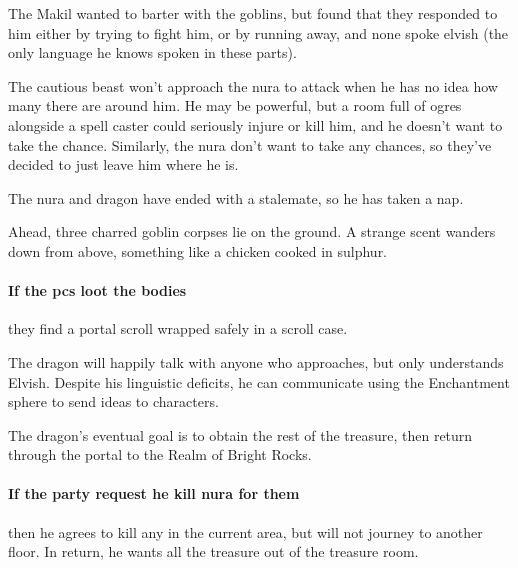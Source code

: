 \begin{multicols}{2}
\begin{exampletext}
  The Makil wanted to barter with the goblins, but found that they responded to him either by trying to fight him, or by running away, and none spoke elvish (the only language he knows spoken in these parts).

  The cautious beast won't approach the nura to attack when he has no idea how many there are around him.
  He may be powerful, but a room full of ogres alongside a spell caster could seriously injure or kill him, and he doesn't want to take the chance.
  Similarly, the nura don't want to take any chances, so they've decided to just leave him where he is.

  The nura and dragon have ended with a stalemate, so he has taken a nap.

\end{exampletext}

\begin{boxtext}

  Ahead, three charred goblin corpses lie on the ground.
  A strange scent wanders down from above, something like a chicken cooked in sulphur.

\end{boxtext}

\paragraph{If the \glspl{pc} loot the bodies}
they find a portal scroll wrapped safely in a scroll case.


The dragon will happily talk with anyone who approaches, but only understands Elvish.
\iftoggle{hardcore}{}{%
  Remind the players that they can spend a Story Point to say that they know another language, as long as they say when they learnt the language.
}
Despite his linguistic deficits, he can communicate using the Enchantment sphere to send ideas to characters.

The dragon's eventual goal is to obtain the rest of the treasure, then return through the portal to the Realm of Bright Rocks.

\paragraph{If the party request he kill nura for them}
then he agrees to kill any in the current area, but will not journey to another floor.
In return, he wants all the treasure out of the treasure room.


\end{multicols}
